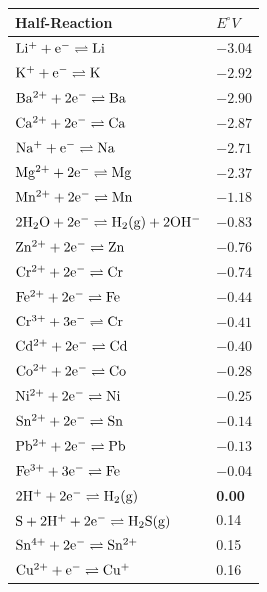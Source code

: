 \begin{table}[p]
\begin{center}
\begin{tabular}{|l|l|}\hline 
\textbf{Half-Reaction}
&
\textbf{$E^{\circ}V$} \\ \hline\hline
$\rm{Li^{+} + e^{-} \rightleftharpoons Li}$ & $-3.04$ \\ \hline
$\rm{K^{+} + e^{-} \rightleftharpoons K }$& $-2.92$ \\ \hline
$\rm{Ba^{2+} + 2e^{-} \rightleftharpoons Ba} $& $-2.90$ \\ \hline
$\rm{Ca^{2+} + 2e^{-} \rightleftharpoons Ca} $& $-2.87$ \\ \hline
$\rm{Na^{+} + e^{-} \rightleftharpoons Na }$& $-2.71$ \\ \hline
$\rm{Mg^{2+} + 2e^{-} \rightleftharpoons Mg }$& $-2.37$ \\ \hline
$\rm{Mn^{2+} + 2e^{-} \rightleftharpoons Mn }$& $-1.18$ \\ \hline
$\rm{2H_{2}O + 2e^{-} \rightleftharpoons H_{2} (g) + 2 OH^{-} }$& $-0.83$ \\ \hline
$\rm{Zn^{2+} + 2e^{-} \rightleftharpoons Zn }$& $-0.76$ \\ \hline
$\rm{Cr^{2+} + 2e^{-} \rightleftharpoons Cr }$& $-0.74$ \\ \hline
$\rm{Fe^{2+} + 2e^{-} \rightleftharpoons Fe }$& $-0.44$ \\ \hline
$\rm{Cr^{3+} + 3e^{-} \rightleftharpoons Cr }$& $-0.41$ \\ \hline
$\rm{Cd^{2+} + 2e^{-} \rightleftharpoons Cd }$& $-0.40$\\ \hline
$\rm{Co^{2+} + 2e^{-} \rightleftharpoons Co }$& $-0.28$ \\ \hline
$\rm{Ni^{2+} + 2e^{-} \rightleftharpoons Ni }$& $-0.25$ \\ \hline
$\rm{Sn^{2+} + 2e^{-} \rightleftharpoons Sn }$& $-0.14$ \\ \hline
$\rm{Pb^{2+} + 2e^{-} \rightleftharpoons Pb }$& $-0.13$ \\ \hline
$\rm{Fe^{3+} + 3e^{-} \rightleftharpoons Fe }$& $-0.04$ \\ \hline
$\rm{2H^{+} + 2e^{-} \rightleftharpoons H_{2} (g) }$& \textbf{0.00} \\ \hline
$\rm{S + 2H^{+} + 2e^{-} \rightleftharpoons H_{2}S (g) }$& 0.14 \\ \hline
$\rm{Sn^{4+} + 2e^{-} \rightleftharpoons Sn^{2+} }$& 0.15 \\ \hline
$\rm{Cu^{2+} + e^{-} \rightleftharpoons Cu^{+} }$& 0.16 \\ \hline

\end{tabular}
\end{center}
\end{table}
